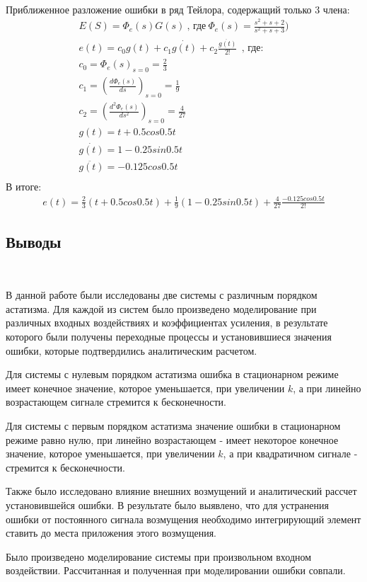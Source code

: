\documentclass[a4paper,12pt]{article}
\begin{document}
	\paragraph {} Приближенное разложение ошибки в ряд Тейлора, содержащий только 3 члена:\\
	\begin{gather}
	E(S)=\Phi_e(s)G(s) ~\text{,~где}~ \displaystyle \Phi_e(s)=\frac{s^2+s+2}{s^2+s+3})\\
	e(t)=c_0g(t)+c_1\dot{g(t)}+c_2\frac{\ddot{g(t)}}{2!}~~\text{, где:}\\
	c_0=\Phi_e(s)_{s=0}=\frac{2}{3}\\
	c_1=(\frac{d\Phi_e(s)}{ds})_{s=0}=\frac{1}{9}\\
	c_2=(\frac{d^2\Phi_e(s)}{ds^2})_{s=0}=\frac{4}{27}\\
	g(t)=t+0.5cos{0.5t}\\
	\dot{g(t)}=1-0.25sin{0.5t}\\
	\ddot{g(t)}=-0.125cos{0.5t}\\
	\end{gather}
	В итоге:
	\begin{gather}
	e(t)=\frac{2}{3}(t+0.5cos{0.5t})+\frac{1}{9}(1-0.25sin{0.5t})+\frac{4}{27}\frac{-0.125cos{0.5t}}{2!}
	\end{gather}
	\newpage
	\begin{center}
		\section{Выводы}  ~~\\
	\end{center}
	\par
	В данной работе были исследованы две системы с различным порядком астатизма. Для каждой из систем было произведено моделирование при различных входных воздействиях и коэффициентах усиления, в результате которого были получены переходные процессы и установившиеся значения ошибки, которые подтвердились аналитическим расчетом.
	\par Для системы с нулевым порядком астатизма ошибка в стационарном режиме имеет конечное значение, которое уменьшается, при увеличении $k$, а при линейно возрастающем сигнале стремится к бесконечности.
	\par Для системы с первым порядком астатизма значение ошибки в стационарном режиме равно нулю, при линейно возрастающем - имеет некоторое конечное значение, которое уменьшается, при увеличении $k$, а при квадратичном сигнале - стремится к бесконечности.    
	\par Также было исследовано влияние внешних возмущений и аналитический рассчет установившейся ошибки. В результате было выявлено, что для устранения ошибки от постоянного сигнала возмущения необходимо интегрирующий элемент ставить до места приложения этого возмущения.
	\par Было произведено моделирование системы при произвольном входном воздействии. Рассчитанная и полученная при моделировании ошибки совпали. 
	
\end{document}
